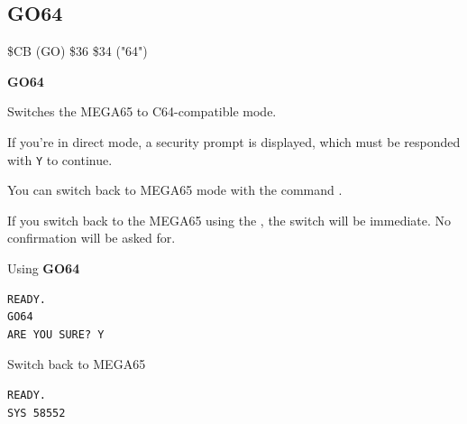 \subsection{GO64}
\begin{description}[leftmargin=2cm,style=nextline]
\item [Token:]    \$CB (GO) \$36 \$34 ("64")

\item [Format:]   {\bf GO64}

\item [Usage:]    Switches the MEGA65 to C64-compatible mode.

                  If you're in direct mode, a security prompt  is displayed, which must be responded with \texttt{Y} to continue.

                  You can switch back to MEGA65 mode with the command .

\item [Remarks:]  If you switch back to the MEGA65 using the , the switch will be immediate. No confirmation will be asked for.

\item [Example:]  Using {\bf GO64}

\begin{tcolorbox}[colback=black,coltext=white]
\verbatimfont{\codefont}
\begin{verbatim}
READY.
GO64
ARE YOU SURE? Y
\end{verbatim}
\end{tcolorbox}

                  Switch back to MEGA65

\begin{tcolorbox}[colback=black,coltext=white]
\verbatimfont{\codefont}
\begin{verbatim}
READY.
SYS 58552
\end{verbatim}
\end{tcolorbox}
\end{description}


\newpage
